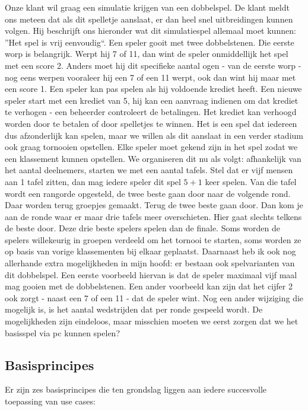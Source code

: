 \begin{example}
Onze klant wil graag een simulatie krijgen van een dobbelspel.  De klant meldt ons meteen dat als dit spelletje aanslaat, er dan heel snel uitbreidingen kunnen volgen. Hij beschrijft ons hieronder wat dit simulatiespel allemaal moet kunnen: ''Het spel is vrij eenvoudig``. Een speler gooit met twee dobbelstenen. Die eerste worp is belangrijk. Werpt hij 7 of 11, dan wint de speler onmiddellijk het spel met een score 2. Anders moet hij dit specifieke aantal ogen - van de eerste worp - nog eens werpen vooraleer hij een 7 of een 11 werpt, ook dan wint hij maar met een score 1. Een speler kan pas spelen als hij voldoende krediet heeft. Een nieuwe speler start met een krediet van 5, hij kan een aanvraag indienen om dat krediet te verhogen - een beheerder controleert de betalingen. Het krediet kan verhoogd worden door te betalen of door spelletjes te winnen. Het is een spel dat iedereen dus afzonderlijk kan spelen, maar we willen als dit aanslaat in een verder stadium ook graag tornooien opstellen.  Elke speler moet  gekend zijn in het spel zodat we een klassement kunnen opstellen. We organiseren dit nu als volgt: afhankelijk van het aantal deelnemers, starten we met een aantal tafels. Stel dat er vijf mensen aan 1 tafel zitten, dan mag iedere speler dit spel $5 + 1$ keer spelen. Van die tafel wordt een rangorde opgesteld, de twee beste gaan door naar de volgende rond. Daar worden terug groepjes gemaakt. Terug de twee beste gaan door.  Dan kom je aan de ronde waar er maar drie tafels meer overschieten.  Hier gaat slechts telkens de beste door. Deze drie beste spelers spelen dan de finale. Soms worden de spelers willekeurig in groepen verdeeld om het tornooi te starten, soms worden ze op basis van vorige klassementen bij elkaar geplaatst. Daarnaast heb ik ook nog allerhande extra mogelijkheden in mijn hoofd: er bestaan ook spelvarianten van dit dobbelspel. Een eerste voorbeeld hiervan is dat de speler maximaal vijf maal mag gooien met de dobbelstenen.  Een ander voorbeeld kan zijn dat het cijfer 2 ook zorgt - naast een 7 of een 11 - dat de speler wint.  Nog een ander wijziging die mogelijk is, is het aantal wedstrijden dat per ronde gespeeld wordt. De mogelijkheden zijn eindeloos, maar misschien moeten we eerst zorgen dat we het basisspel via pc kunnen spelen?
\end{example}

\subsection{Basisprincipes}
Er zijn zes basisprincipes die ten grondslag liggen aan iedere succesvolle toepassing van use cases:

